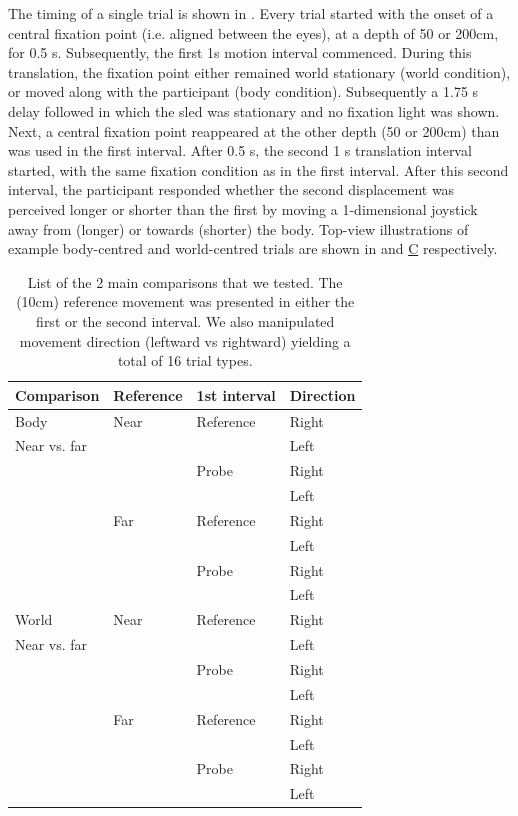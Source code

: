 The timing of a single trial is shown in . Every trial started with the onset of a central fixation point (i.e. aligned between the eyes), at a depth of 50 or 200\si{\centi\metre}, for 0.5 \si{\second}. Subsequently, the first 1\si{\second} motion interval commenced. During this translation, the fixation point either remained world stationary (world condition), or moved along with the participant (body condition).  Subsequently a 1.75 \si{\second} delay followed in which the sled was stationary and no  fixation light was shown. Next, a central fixation point reappeared at the other depth (50 or 200\si{\centi\metre}) than was used in the first interval. After 0.5 \si{\second}, the second 1 \si{\second} translation interval started, with the same fixation condition as in the first interval. After this second interval, the participant responded whether the second displacement was perceived longer or shorter than the first by moving a 1-dimensional joystick away from (longer) or towards (shorter) the body. Top-view illustrations of example body-centred and world-centred trials are shown in  and \hyperref[p4:fig1]{C} respectively.

\begin{table}
    \begin{tabular}{llll}
    Comparison & Reference & 1st interval & Direction \\
    \hline
    Body & Near & Reference & Right \\
    Near vs. far & & & Left \\
    & & Probe & Right \\
    & & & Left \\
    \cline{2-4}
	& Far & Reference & Right \\
    & & & Left \\
    & & Probe & Right \\
    & & & Left \\
    \hline
    World & Near & Reference & Right \\
    Near vs. far & & & Left \\
    & & Probe & Right \\
    & & & Left \\
    \cline{2-4}
	& Far & Reference & Right \\
    & & & Left \\
    & & Probe & Right \\
    & & & Left \\
    \end{tabular}

    \caption{List of the 2 main comparisons that we tested. The (10cm) reference movement was presented in either the first or the second interval. We also manipulated movement direction (leftward vs rightward) yielding a total of 16 trial types.}

    \label{p4:tab1}
\end{table}


